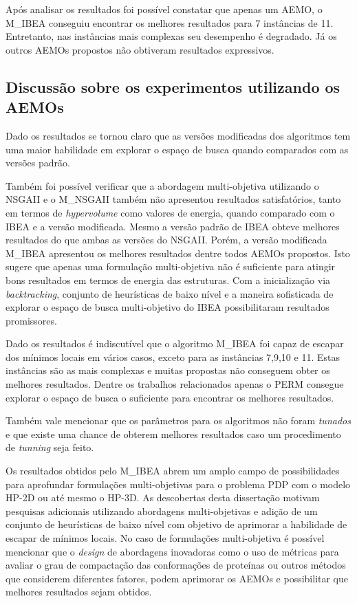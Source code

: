 Após analisar os resultados foi possível constatar que apenas um AEMO, o M\_IBEA conseguiu encontrar os melhores resultados para 7 instâncias de 11. Entretanto, nas instâncias mais complexas seu desempenho é degradado. Já os outros AEMOs propostos não obtiveram resultados expressivos.

\subsection{Discussão sobre os experimentos utilizando os AEMOs}

Dado os resultados se tornou claro que as versões modificadas dos algoritmos tem uma maior habilidade em explorar o espaço de busca quando comparados com as versões padrão.  

Também foi possível verificar que a abordagem multi-objetiva utilizando o NSGAII e o M\_NSGAII também não apresentou resultados satisfatórios, tanto em termos de \textit{hypervolume} como valores de energia,  quando comparado com o IBEA e a versão modificada. Mesmo a versão padrão de IBEA obteve melhores resultados do que ambas as versões do NSGAII. Porém, a versão modificada M\_IBEA apresentou os melhores resultados dentre todos AEMOs propostos. Isto sugere que apenas uma formulação multi-objetiva não é suficiente para atingir bons resultados em termos de energia das estruturas. Com a inicialização via \textit{backtracking}, conjunto de heurísticas de baixo nível e a maneira sofisticada de explorar o espaço de busca multi-objetivo do IBEA  possibilitaram resultados promissores.

Dado os resultados é indiscutível que o algoritmo M\_IBEA foi capaz de escapar dos mínimos locais em vários casos, exceto para as instâncias 7,9,10 e 11. Estas instâncias são as mais complexas e muitas propostas não conseguem obter os melhores resultados. Dentre  os trabalhos relacionados apenas o PERM consegue  explorar o espaço de busca o suficiente para encontrar os melhores resultados.

Também vale mencionar que os parâmetros para os algoritmos não foram \textit{tunados} e que existe uma chance de obterem melhores resultados caso um procedimento de \textit{tunning} seja feito.

Os resultados obtidos pelo M\_IBEA abrem um amplo campo de possibilidades para aprofundar formulações multi-objetivas para o problema PDP com o modelo HP-2D ou até mesmo o HP-3D. As descobertas desta dissertação motivam pesquisas adicionais utilizando abordagens multi-objetivas e adição de um conjunto de heurísticas de baixo nível com objetivo de aprimorar a habilidade de escapar de mínimos locais. No caso de formulações multi-objetiva é possível mencionar que o \textit{design} de abordagens inovadoras como o uso de métricas para avaliar o grau de compactação das conformações de proteínas ou outros métodos que considerem diferentes fatores, podem aprimorar os AEMOs e possibilitar que melhores resultados sejam obtidos.



